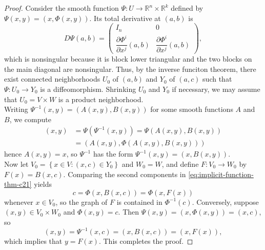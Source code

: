 \documentclass[reqno]{amsart}
\theoremstyle{plain}%
\theoremstyle{definition}
\theoremstyle{remark}
\begin{document}
        \begin{proof}
        Consider the smooth function $\Psi  \colon U \to \mathbb{R}^{n} \times
        \mathbb{R}^{k}$ defined by
        $\Psi (x,y) = \left( x, \Phi(x,y) \right) $. Its total derivative at
        $(a,b)$ is
        \[
        D \Psi (a,b) = 
        \begin{pmatrix} 
            I_n & 0\\
            \dfrac{\partial \Phi^{i}}{\partial x^{j}}(a,b) & \dfrac{\partial
            \Phi^{i}}{\partial x^{j}} (a,b)
        \end{pmatrix},
        \] 
        which is nonsingular because it is block lower triangular and the two
        blocks on the main diagonal are nonsingular. 
        Thus, by the inverse funciton theorem, there exist connected neighborhoods
        $U_0$ of $(a,b)$ and $Y_0$ of $(a,c)$ such that
        $\Psi  \colon U_0 \to Y_0$ is a diffeomorphism. Shrinking
        $U_0$ and $Y_0$ if necessary, we may assume that
        $U_0 = V \times W$ is a product neighborhood.\\
        Writing $\Psi^{-1}(x,y) = \left( A(x,y), B(x,y) \right) $ for some smooth
        functions $A$ and $B$, we compute
        \begin{align*}
            (x,y)
            &= \Psi \left( \Psi^{-1}(x,y) \right) = \Psi \left( A(x,y), B(x,y)
            \right) \\
            &= \left( A(x,y), \Phi \left( A(x,y), B(x,y) \right)  \right) \tag{$\omega $}
            \label{eq:implicit-function-thm-c21}
        \end{align*}
        hence $A(x,y) = x$, so $\Psi^{-1}$ has the form
        $\Psi^{-1}(x,y) = \left( x, B(x,y) \right) $.\\
        Now let $V_0 = \left\{ x \in V  \colon
        \left( x,c \right)  \in Y_0 \right\} $ and
        $W_0 = W$, and define $F  \colon V_0 \to W_0$ by
        $F(x) = B(x,c)$. Comparing the second components in
        \eqref{eq:implicit-function-thm-c21} yields
        \[
        c   = \Phi \left( x, B(x,c) \right) = \Phi \left( x, F(x) \right) 
        \] 
        whenever $x \in V_0$, so the graph of $F$ is contained in
        $\Phi^{-1}(c)$. Conversely, suppose
        $\left( x,y \right) \in V_0 \times W_0$ and
        $\Phi(x,y) = c$. Then $\Psi(x,y) = 
        \left( x, \Phi (x,y) \right) = (x,c)$, so
        \[
            (x,y) = \Psi^{-1}\left( x,c \right) =
            \left( x, B(x,c) \right) =
            (x,F(x)),
        \] 
        which implies that $y = F(x)$. This completes the proof.
        \end{proof}
\end{document}
